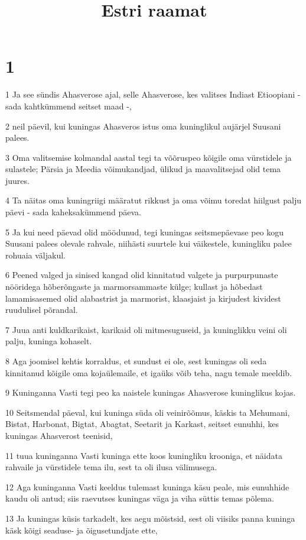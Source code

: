 

\title{Estri raamat}

\chapter{1}

\par 1 Ja see sündis Ahasverose ajal, selle Ahasverose, kes valitses Indiast Etioopiani - sada kahtkümmend seitset maad -,
\par 2 neil päevil, kui kuningas Ahasveros istus oma kuninglikul aujärjel Suusani palees.
\par 3 Oma valitsemise kolmandal aastal tegi ta võõruspeo kõigile oma vürstidele ja sulastele; Pärsia ja Meedia võimukandjad, ülikud ja maavalitsejad olid tema juures.
\par 4 Ta näitas oma kuningriigi määratut rikkust ja oma võimu toredat hiilgust palju päevi - sada kaheksakümmend päeva.
\par 5 Ja kui need päevad olid möödunud, tegi kuningas seitsmepäevase peo kogu Suusani palees olevale rahvale, niihästi suurtele kui väikestele, kuningliku palee rohuaia väljakul.
\par 6 Peened valged ja sinised kangad olid kinnitatud valgete ja purpurpunaste nööridega hõberõngaste ja marmorsammaste külge; kullast ja hõbedast lamamisasemed olid alabastrist ja marmorist, klaasjaist ja kirjudest kividest ruudulisel põrandal.
\par 7 Juua anti kuldkarikaist, karikaid oli mitmesuguseid, ja kuninglikku veini oli palju, kuninga kohaselt.
\par 8 Aga joomisel kehtis korraldus, et sundust ei ole, sest kuningas oli seda kinnitanud kõigile oma kojaülemaile, et igaüks võib teha, nagu temale meeldib.
\par 9 Kuninganna Vasti tegi peo ka naistele kuningas Ahasverose kuninglikus kojas.
\par 10 Seitsmendal päeval, kui kuninga süda oli veinirõõmus, käskis ta Mehumani, Bistat, Harbonat, Bigtat, Abagtat, Seetarit ja Karkast, seitset eunuhhi, kes kuningas Ahasverost teenisid,
\par 11 tuua kuninganna Vasti kuninga ette koos kuningliku krooniga, et näidata rahvaile ja vürstidele tema ilu, sest ta oli ilusa välimusega.
\par 12 Aga kuninganna Vasti keeldus tulemast kuninga käsu peale, mis eunuhhide kaudu oli antud; siis raevutses kuningas väga ja viha süttis temas põlema.
\par 13 Ja kuningas küsis tarkadelt, kes aegu mõistsid, sest oli viisiks panna kuninga käsk kõigi seaduse- ja õigusetundjate ette,
